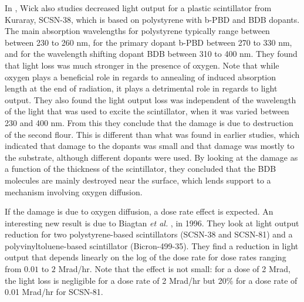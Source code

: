 In \cite{Wick1991472}, Wick also studies decreased light
output for a plastic scintillator from Kuraray, SCSN-38, which
is based on polystyrene with b-PBD and BDB dopants.
The main absorption wavelengths for polystyrene typically range between
between 230 to 260 nm, for the primary dopant b-PBD between 270 to 330 nm,
and for the wavelength shifting dopant BDB between 310 to 400 nm.
They found that light loss was much stronger in the presence of oxygen.
Note that while oxygen plays a beneficial role in regards
to annealing of induced absorption length at the end of radiation, 
it plays a detrimental role in 
regards to light output.  
They also found the light output loss
was independent of the wavelength of the light
that was used to excite the scintillator, when it
was varied between 230 and 400 nm.
From this they conclude that the damage is due to destruction
of the second flour.  This is different than what was found in
earlier studies, which indicated that damage to the dopants was
small and that damage was mostly to the substrate,
although different dopants were used.
By looking at the damage as a function of the thickness of the scintillator,
they concluded that the BDB molecules are mainly destroyed
near the surface, which lends support to a mechanism involving
oxygen diffusion.

If the damage is due to oxygen diffusion, a dose rate effect
is expected.
An interesting new result is due to Biagtan {\it{et al.}} \cite{Biagtan1996125}, in 1996.  They look at light output reduction for two
polystyrene-based scintillators (SCSN-38 and SCSN-81) and a
polyvinyltoluene-based scintillator (Bicron-499-35).  
They find a reduction in light output that depends linearly on the
log of the dose rate for dose rates ranging from $0.01$ to
$2$ Mrad/hr.  Note that the effect is not small: for a
dose of 2 Mrad, the light loss is negligible for a dose rate
of 2 Mrad/hr but 20\% for a dose rate of 0.01 Mrad/hr for SCSN-81.

